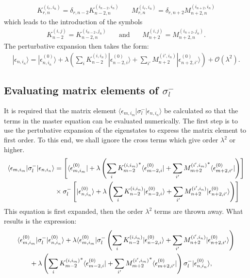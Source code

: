 \documentclass[a4paper]{memoir}
\newcommand{\bra}[1]{\langle#1|}
\newcommand{\ket}[1]{|#1\rangle}
\newcommand{\gap}{\,\,\,\,\,\,\,\,\,\,\,}
\newcommand{\enn}{\epsilon_{n,i_n}}
\newcommand{\enm}{\epsilon_{m,i_m}}
\newcommand{\ennnought}{\epsilon_{n,i_n}^{(0)}}
\newcommand{\enmnought}{\epsilon_{m,i_m}^{(0)}}
\begin{document}
\begin{align}
  K_{r,n}^{(i_r,i_n)}=\delta_{r,n-2}K_{n-2,n}^{(i_{n-2},i_n)}\gap
  M_{r,n}^{(i_r,i_n)}=\delta_{r,n+2}M_{n+2,n}^{(i_{n+2},i_n)}
\end{align}
which leads to the introduction of the symbols
\begin{align}
  K_{n-2}^{(i,j)}=K_{n-2,n}^{(i_{n-2},j_n)}\gap\text{and}\gap
  M_{n+2}^{(i,j)}=M_{n+2,n}^{(i_{n+2},j_n)}.
\end{align}
The perturbative expansion then takes the form:
\begin{align}
  \ket{\enn} = \ket{\ennnought}+\lambda\left(
  \sum_{i}K_{n-2}^{(i,i_n)}\ket{\epsilon_{n-2,i}^{(0)}}
  +\sum_{i'}M_{n+2}^{(i',i_n)}\ket{\epsilon_{n+2,i'}^{(0)}}\right)
  +\mathcal{O}(\lambda^2).
\end{align}
%
\subsection{Evaluating matrix elements of $\sigma_l^-$}
%
It is required that the matrix element
$\bra{\enm}\sigma_l^-\ket{\enn}$ be calculated so that the terms in
the master equation can be evaluated numerically. The first step is to
use the pertubative expansion of the eigenstates to express the matrix
element to first order. To this end, we shall ignore the cross terms
which give order $\lambda^2$ or higher.
\begin{align}
  \bra{\enm}\sigma_l^-\ket{\enn} &= \left[\bra{\enmnought} + \lambda
    \left( \sum_{i}{K_{m-2}^{(i,i_m)}}^* \bra{\epsilon_{m-2,i}^{(0)}}
    +\sum_{i'}{M_{m+2}^{(i',i_m)}}^* \bra{\epsilon_{m+2,i'}^{(0)}}
    \right)\right]\notag \\ &\times\sigma_l^-\left[\ket{\ennnought} +
    \lambda \left( \sum_{i}K_{n-2}^{(i,i_n)}
    \ket{\epsilon_{n-2,i}^{(0)}} +\sum_{i'}M_{n+2}^{(i',i_n)}
    \ket{\epsilon_{n+2,i'}^{(0)}} \right)\right] \notag \\
\end{align}
This equation is first expanded, then the order $\lambda^2$ terms are thrown away. What results is the expression:
\begin{align}
  &\bra{\enmnought}\sigma_l^-\ket{\ennnought}+
  \lambda\bra{\enmnought}\sigma_l^-\left( \sum_{i}K_{n-2}^{(i,i_n)}
  \ket{\epsilon_{n-2,i}^{(0)}} +\sum_{i'}M_{n+2}^{(i',i_n)}
  \ket{\epsilon_{n+2,i'}^{(0)}} \right) \notag \\ &\gap + \lambda
  \left( \sum_{i}{K_{m-2}^{(i,i_m)}}^* \bra{\epsilon_{m-2,i}^{(0)}}
  +\sum_{i'}{M_{m+2}^{(i',i_m)}}^* \bra{\epsilon_{m+2,i'}^{(0)}}
  \right)\sigma_l^-\ket{\ennnought},\notag
\end{align}
\end{document}
